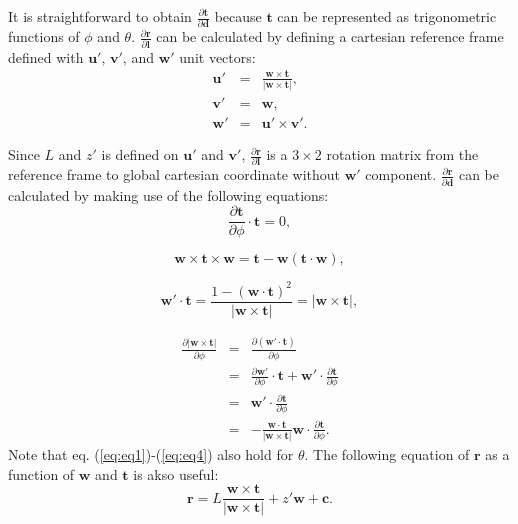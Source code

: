 \documentclass[12pt,a4paper]{scrarticle}
\begin{document}
It is straightforward to obtain $\frac{\partial{\mathbf{t}}}{\partial{\mathbf{d}}}$ because $\mathbf{t}$ can be represented as trigonometric functions of $\phi$ and $\theta$. $\frac{\partial{\mathbf{r}}}{\partial{\mathbf{l}}}$ can be calculated by defining a cartesian reference frame defined with $\mathbf{u}'$, $\mathbf{v}'$, and $\mathbf{w}'$ unit vectors:
\begin{eqnarray}\label{eq:new_coord}
    \mathbf{u}' & = & \frac{\mathbf{w} \times \mathbf{t}}{|\mathbf{w} \times \mathbf{t}|}, \nonumber \\
    \mathbf{v}' & = & \mathbf{w}, \nonumber \\
    \mathbf{w}' & = & \mathbf{u}' \times \mathbf{v}'.
\end{eqnarray}

Since $L$ and $z'$ is defined on $\mathbf{u}'$ and $\mathbf{v}'$, $\frac{\partial{\mathbf{r}}}{\partial{\mathbf{l}}}$ is a $3 \times 2$ rotation matrix from the reference frame to global cartesian coordinate without $\mathbf{w}'$ component. $\frac{\partial{\mathbf{r}}}{\partial{\mathbf{d}}}$ can be calculated by making use of the following equations:
\begin{equation}\label{eq:eq1}
    \frac{\partial \mathbf{t}}{\partial \phi} \cdot \mathbf{t} = 0,
\end{equation}

\begin{equation}\label{eq:eq2}
    \mathbf{w} \times \mathbf{t} \times \mathbf{w} = \mathbf{t} - \mathbf{w}(\mathbf{t} \cdot \mathbf{w}),
\end{equation}

\begin{equation}\label{eq:eq3}
    \mathbf{w}' \cdot \mathbf{t} = \frac{1- (\mathbf{w} \cdot \mathbf{t})^2}{|\mathbf{w} \times \mathbf{t}|} = |\mathbf{w} \times \mathbf{t}|,
\end{equation}

\begin{eqnarray}\label{eq:eq4}
    \frac{\partial |\mathbf{w} \times \mathbf{t}|}{\partial \phi} & = & \frac{\partial ( \mathbf{w}' \cdot \mathbf{t} )}{\partial \phi} \nonumber \\
          & = & \frac{\partial \mathbf{w}'}{\partial \phi} \cdot \mathbf{t} + \mathbf{w}' \cdot \frac{\partial \mathbf{t}}{\partial \phi} \nonumber \\
          & = & \mathbf{w}' \cdot \frac{\partial \mathbf{t}}{\partial \phi} \nonumber \\
          & = & - \frac{\mathbf{w} \cdot \mathbf{t}}{|\mathbf{w} \times \mathbf{t}|} \mathbf{w} \cdot \frac{\partial \mathbf{t}}{\partial \phi}.
\end{eqnarray}
Note that eq. (\ref{eq:eq1})-(\ref{eq:eq4}) also hold for $\theta$. The following equation of $\mathbf{r}$ 
 as a function of $\mathbf{w}$ and $\mathbf{t}$ is akso useful:
\begin{equation}
    \mathbf{r} = L \frac{\mathbf{w} \times \mathbf{t}}{|\mathbf{w} \times \mathbf{t}|} + z' \mathbf{w} +  \mathbf{c}.
\end{equation}
\end{document}
